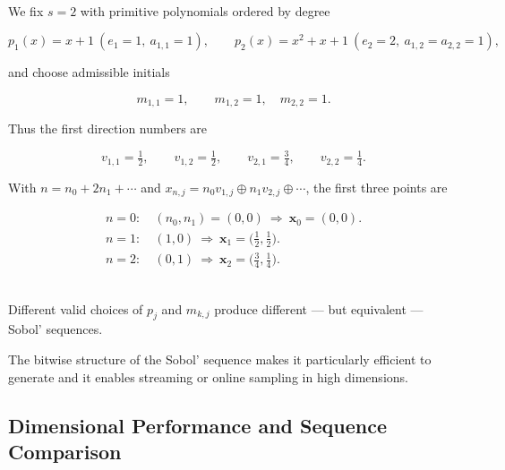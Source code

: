 \begin{example}
\ \\
We fix $s=2$ with primitive polynomials ordered by degree

\begin{equation*}
    p_1(x)=x+1 \ (e_1=1,\ a_{1,1}=1),\qquad
    p_2(x)=x^2+x+1 \ (e_2=2,\ a_{1,2}=a_{2,2}=1),
\end{equation*}

and choose admissible initials

\begin{equation*}
    m_{1,1}=1,\qquad m_{1,2}=1,\quad m_{2,2}=1.
\end{equation*}

Thus the first direction numbers are

\begin{equation*}
    v_{1,1}=\tfrac12,\qquad v_{1,2}=\tfrac12,\qquad v_{2,1}=\tfrac34,\qquad v_{2,2}=\tfrac14.
\end{equation*}

With $n=n_0+2n_1+\cdots$ and $x_{n,j}=n_0 v_{1,j}\oplus n_1
v_{2,j}\oplus\cdots$, the first three points are

\begin{align*}
n=0:\ & (n_0,n_1)=(0,0)\ \Rightarrow\ \boldsymbol{x}_0=(0,0).\\
n=1:\ & (1,0)\ \Rightarrow\ \boldsymbol{x}_1=\bigl(\tfrac12,\tfrac12\bigr).\\
n=2:\ & (0,1)\ \Rightarrow\ \boldsymbol{x}_2=\bigl(\tfrac34,\tfrac14\bigr).
\end{align*}

\end{example}

\begin{remark} \ \\
Different valid choices of $p_j$ and $m_{k,j}$ produce different --- but
equivalent --- Sobol' sequences.
\end{remark}

The bitwise structure of the Sobol' sequence makes it particularly efficient to
generate and it enables streaming or online sampling in high dimensions.

\subsection{Dimensional Performance and Sequence Comparison}
\label{subsec:dimensional-performance}

